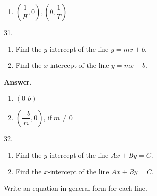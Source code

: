 \documentclass[10pt,]{book}
\theoremstyle{plain}
\theoremstyle{definition}
\theoremstyle{definition}
\theoremstyle{definition}
\numberwithin{equation}{part}
\begin{document}
\begin{exerciselist}
\begin{multicols}{2}
\begin{enumerate}[label=*\alph**]
\item\hypertarget{li-217}{}\(\left(\dfrac{1}{H}, 0\right), \left(0, \dfrac{1}{T}\right) \)%
\end{enumerate}
\end{multicols}
\par\smallskip
\item[31.]\hypertarget{exercise-38}{}\leavevmode%
\begin{enumerate}[label=*\alph**]
\item\hypertarget{li-218}{}Find the \(y\)-intercept of the line \(y = mx + b\).%
\item\hypertarget{li-219}{}Find the \(x\)-intercept of the line \(y = mx + b\).%
\end{enumerate}
%
\par\smallskip
\par\smallskip
\noindent\textbf{Answer.}\hypertarget{answer-23}{}\quad
\leavevmode%
\begin{enumerate}[label=*\alph**]
\item\hypertarget{li-220}{}\((0, b)\)%
\item\hypertarget{li-221}{}\(\left(\dfrac{-b}{m},0\right)\), if \(m\ne 0\)%
\end{enumerate}
%
\item[32.]\hypertarget{exercise-39}{}\leavevmode%
\begin{enumerate}[label=*\alph**]
\item\hypertarget{li-222}{}Find the \(y\)-intercept of the line \(Ax + By = C\).%
\item\hypertarget{li-223}{}Find the \(x\)-intercept of the line \(Ax + By = C\).%
\end{enumerate}
%
\par\smallskip
\end{exerciselist}
\hypertarget{exercisegroup-4}{}\par\noindent Write an equation in general form for each line.%
\end{document}
